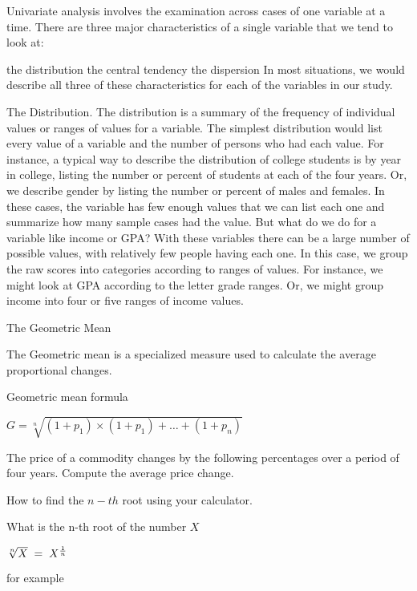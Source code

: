 Univariate analysis involves the examination across cases of one variable at a time. There are three major characteristics of a single variable that we tend to look at:

the distribution
the central tendency
the dispersion
In most situations, we would describe all three of these characteristics for each of the variables in our study.




The Distribution. The distribution is a summary of the frequency of individual values or ranges of values for a variable. The simplest distribution would list every value of a variable and the number of persons who had each value. For instance, a typical way to describe the distribution of college students is by year in college, listing the number or percent of students at each of the four years. Or, we describe gender by listing the number or percent of males and females. In these cases, the variable has few enough values that we can list each one and summarize how many sample cases had the value. But what do we do for a variable like income or GPA? With these variables there can be a large number of possible values, with relatively few people having each one. In this case, we group the raw scores into categories according to ranges of values. For instance, we might look at GPA according to the letter grade ranges. Or, we might group income into four or five ranges of income values.



The Geometric Mean

The Geometric mean is a specialized measure used to calculate the average proportional changes.

Geometric mean formula

$G = \sqrt[n]{(1+p_1) \times (1+p_1) +  \ldots + (1+p_n)}$

The price of a commodity changes by the following percentages over a period of four years.
Compute the average price change.



How to find the $n-th$ root using your calculator.

What is the n-th root of the number $X$

$\sqrt[n]{X} \;= \; X^{1 \over n} $

for example

